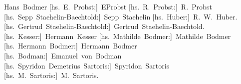 \begin{ledgroupsized}[t]{13cm}
           \pstart
           \spacefill\mbox{Hans Bodmer}\pend
           \pstart
           \spacefill\mbox{{[}hs. E. Probst:{]} EProbst}\pend
           \pstart
           \spacefill\mbox{{[}hs. R. Probst:{]} R. Probst}\pend
           \pstart
           \spacefill\mbox{{[}hs. Sepp Staehelin-Baechtold:{]} Sepp Staehelin}\pend
           \pstart
           \spacefill\mbox{{[}hs. Huber:{]} R. W. Huber.}\pend
           \pstart
           \spacefill\mbox{{[}hs. Gertrud Staehelin-Baechtold:{]} Gertrud Staehelin-Baechtold.}\pend
           \pstart
           \spacefill\mbox{{[}hs. Kesser:{]} Hermann Kesser}\pend
           \pstart
           \spacefill\mbox{{[}hs. Mathilde Bodmer:{]} Mathilde Bodmer}\pend
           \pstart
           \spacefill\mbox{{[}hs. Hermann Bodmer:{]} Hermann Bodmer}\pend
           \pstart
           \spacefill\mbox{{[}hs. Bodman:{]} Emanuel von Bodman}\pend
           \pstart
           \spacefill\mbox{{[}hs. Spyridon Demetrius Sartoris:{]} Spyridon Sartoris}\pend
           \pstart
           \spacefill\mbox{{[}hs. M. Sartoris:{]} M. Sartoris.}\pend
           
         
         \endnumbering{}\end{ledgroupsized}  \newcommand{\dateiname}{L01799}\newcommand{\titel}{Hermann Bodmer und andere an Arthur Schnitzler, 9. 11. 1908}\newcommand{\editorInnen}{Martin Anton Müller und Gerd-Hermann Susen}
      